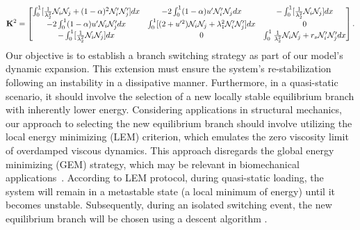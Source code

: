\begin{equation}
{\bf K}^2=\begin{bmatrix}
\int_0^1[ \frac{1}{\lambda_2^2}{\mathcal N}_i{\mathcal N}_j + (1-\alpha)^2{\mathcal N}'_i{\mathcal N}'_j] dx&
-2\int_0^1(1-\alpha)u' {\mathcal N}'_i {\mathcal N}_j  dx&
-\int_0^1[\frac{1}{\lambda_2^2}{\mathcal N}_i {\mathcal N}_j]  dx\\

-2\int_0^1(1-\alpha)u' {\mathcal N}_i {\mathcal N}'_j dx&
 \int_0^1 [ (2+u'^2){\mathcal N}_i{\mathcal N}_j +\lambda_1^2{\mathcal N}'_i{\mathcal N}'_j] dx&
 0\\

-\int_0^1[\frac{1}{\lambda_2^2}{\mathcal N}_i{\mathcal N}_j ] dx
&0
&\int_0^1\frac{1}{\lambda_2^2}{\mathcal N}_i {\mathcal N}_j+r_s{\mathcal N}'_i {\mathcal N}'_j  dx
\end{bmatrix}.
\label{eq:stifness2}
\end{equation}
Our objective is to establish a branch switching strategy as part of our model's dynamic expansion. This extension must ensure the system's re-stabilization following an instability in a dissipative manner. Furthermore, in a quasi-static scenario, it should involve the selection of a new locally stable equilibrium branch with inherently lower energy.  Considering applications in structural mechanics, our approach to selecting the new equilibrium branch should involve utilizing the local energy minimizing (LEM) criterion, which emulates the zero viscosity limit of overdamped viscous dynamics. This approach disregards the global energy minimizing (GEM) strategy, which may be relevant in biomechanical applications~\cite{Salman2021-mn}. According to LEM protocol, during quasi-static loading, the system will remain in a metastable state (a local minimum of energy) until it becomes unstable. Subsequently, during an isolated switching event, the new equilibrium branch will be chosen using a descent algorithm \cite{Puglisi2005-lg}.
